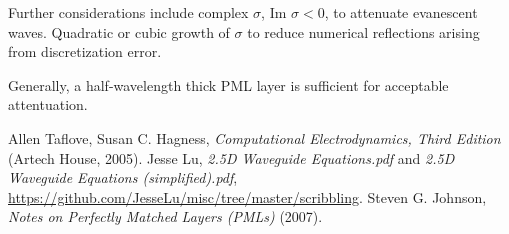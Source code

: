 \documentclass{article}
\begin{document}
Further considerations include complex $\sigma$, $\text{Im }\sigma < 0$, to attenuate evanescent waves. Quadratic or cubic growth of $\sigma$ to reduce numerical reflections arising from discretization error. 

Generally, a half-wavelength thick PML layer is sufficient for acceptable attentuation.

\begin{thebibliography}{99}
 Allen Taflove, Susan C. Hagness, \emph{Computational Electrodynamics, Third Edition} (Artech House, 2005). 
 Jesse Lu, \emph{2.5D Waveguide Equations.pdf} and \emph{2.5D Waveguide Equations (simplified).pdf}, \url{https://github.com/JesseLu/misc/tree/master/scribbling}.
 Steven G. Johnson, \emph{Notes on Perfectly Matched Layers (PMLs)} (2007).
\end{thebibliography}
\end{document}
